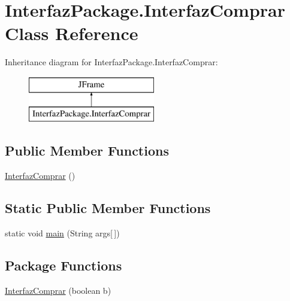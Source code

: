 \hypertarget{class_interfaz_package_1_1_interfaz_comprar}{}\section{Interfaz\+Package.\+Interfaz\+Comprar Class Reference}
\label{class_interfaz_package_1_1_interfaz_comprar}
Inheritance diagram for Interfaz\+Package.\+Interfaz\+Comprar\+:\begin{figure}[H]
\begin{center}
\leavevmode
\includegraphics[height=2.000000cm]{class_interfaz_package_1_1_interfaz_comprar}
\end{center}
\end{figure}
\subsection*{Public Member Functions}
\begin{DoxyCompactItemize}
\item 
\mbox{\hyperlink{class_interfaz_package_1_1_interfaz_comprar_a6804902a37338613a4d0ff3fcbec5f42}{Interfaz\+Comprar}} ()
\end{DoxyCompactItemize}
\subsection*{Static Public Member Functions}
\begin{DoxyCompactItemize}
\item 
static void \mbox{\hyperlink{class_interfaz_package_1_1_interfaz_comprar_acbcd31e7253a1c9add6125392284a0fd}{main}} (String args\mbox{[}$\,$\mbox{]})
\end{DoxyCompactItemize}
\subsection*{Package Functions}
\begin{DoxyCompactItemize}
\item 
\mbox{\hyperlink{class_interfaz_package_1_1_interfaz_comprar_a061e815e902df5923e9fed703c6d63b2}{Interfaz\+Comprar}} (boolean b)
\end{DoxyCompactItemize}
